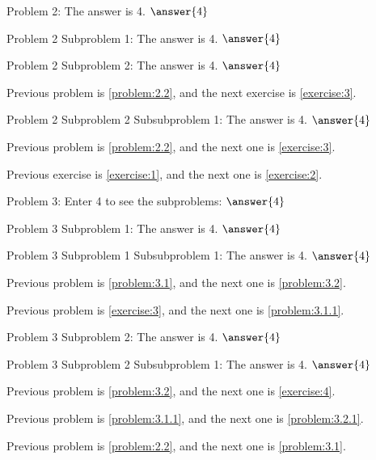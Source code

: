 \documentclass{ximera}
\begin{document}
\begin{exercise}\label{exercise:2}
    Problem 2: The answer is 4. $\answer{4}$
    \begin{problem}\label{problem:2.1}
        Problem 2 Subproblem 1: The answer is 4. $\answer{4}$
    \end{problem} 
    \begin{problem}\label{problem:2.2}
        Problem 2 Subproblem 2: The answer is 4. $\answer{4}$
        
        Previous problem is \ref{problem:2.2}, and the next exercise is \ref{exercise:3}.
        \begin{problem}\label{problem:2.2.1}
            Problem 2 Subproblem 2 Subsubproblem 1: The answer is 4. $\answer{4}$
            \par\medskip
            Previous problem is \ref{problem:2.2}, and the next one is \ref{exercise:3}.
            \medskip
        \end{problem}
    \end{problem} 
    \par\medskip
    Previous exercise is \ref{exercise:1}, and the next one is \ref{exercise:2}.
    \medskip
\end{exercise} 

\begin{exercise}\label{exercise:3}
    Problem 3: Enter 4 to see the subproblems: $\answer{4}$
    \begin{problem}\label{problem:3.1}
        Problem 3 Subproblem 1: The answer is 4. $\answer{4}$
        \begin{problem}\label{problem:3.1.1}
            Problem 3 Subproblem 1 Subsubproblem 1: The answer is 4. $\answer{4}$
            \par\medskip
            Previous problem is \ref{problem:3.1}, and the next one is \ref{problem:3.2}.
            \medskip
        \end{problem} 
        \par\medskip
        Previous problem is \ref{exercise:3}, and the next one is \ref{problem:3.1.1}.
        \medskip
    \end{problem}
    \begin{problem}\label{problem:3.2}
        Problem 3 Subproblem 2: The answer is 4. $\answer{4}$
        \begin{problem}\label{problem:3.2.1}
            Problem 3 Subproblem 2 Subsubproblem 1: The answer is 4. $\answer{4}$
            \par\medskip
            Previous problem is \ref{problem:3.2}, and the next one is \ref{exercise:4}.
            \medskip
        \end{problem} 
        \par\medskip
        Previous problem is \ref{problem:3.1.1}, and the next one is \ref{problem:3.2.1}.
        \medskip
    \end{problem} 
    \par\medskip
    Previous problem is \ref{problem:2.2}, and the next one is \ref{problem:3.1}.
    \medskip
\end{exercise} 
\end{document}
